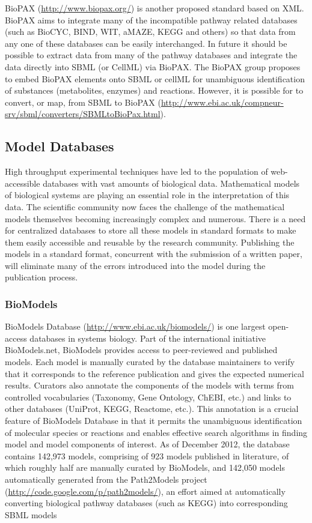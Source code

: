 BioPAX (\url{http://www.biopax.org/}) \autocite{demir2010biopax}
\autocite{stromback2005representations} is another proposed standard
based on XML. BioPAX aims to integrate many of the incompatible pathway
related databases (such as BioCYC, BIND, WIT, aMAZE, KEGG and others) so
that data from any one of these databases can be easily interchanged. In
future it should be possible to extract data from many of the pathway
databases and integrate the data directly into SBML (or CellML) via
BioPAX. The BioPAX group proposes to embed BioPAX elements onto SBML or
cellML for unambiguous identification of substances (metabolites,
enzymes) and reactions. However, it is possible for to convert, or map,
from SBML to BioPAX
(\url{http://www.ebi.ac.uk/compneur-srv/sbml/converters/SBMLtoBioPax.html}).

\subsection{Model Databases}

High throughput experimental techniques have led to the population of
web- accessible databases with vast amounts of biological data.
Mathematical models of biological systems are playing an essential role
in the interpretation of this data. The scientific community now faces
the challenge of the mathematical models themselves becoming
increasingly complex and numerous. There is a need for centralized
databases to store all these models in standard formats to make them
easily accessible and reusable by the research community. Publishing the
models in a standard format, concurrent with the submission of a written
paper, will eliminate many of the errors introduced into the model
during the publication process.

\subsubsection{BioModels}

BioModels Database (\url{http://www.ebi.ac.uk/biomodels/})
\autocite{le2006biomodels} is one largest open- access databases in
systems biology. Part of the international initiative BioModels.net,
BioModels provides access to peer-reviewed and published models. Each
model is manually curated by the database maintainers to verify that it
corresponds to the reference publication and gives the expected
numerical results. Curators also annotate the components of the models
with terms from controlled vocabularies (Taxonomy, Gene Ontology, ChEBI,
etc.) and links to other databases (UniProt, KEGG, Reactome, etc.). This
annotation is a crucial feature of BioModels Database in that it permits
the unambiguous identification of molecular species or reactions and
enables effective search algorithms in finding model and model
components of interest. As of December 2012, the database contains
142,973 models, comprising of 923 models published in literature, of
which roughly half are manually curated by BioModels, and 142,050 models
automatically generated from the Path2Models project
(\url{http://code.google.com/p/path2models/}), an effort aimed at
automatically converting biological pathway databases (such as KEGG)
into corresponding SBML models

